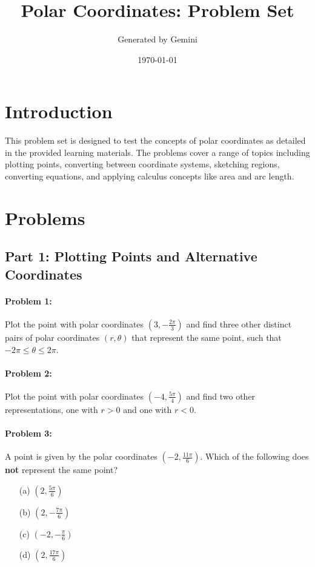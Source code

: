 \documentclass{article}
\title{Polar Coordinates: Problem Set}
\author{Generated by Gemini}
\date{\today}
\begin{document}
\maketitle

\section*{Introduction}
This problem set is designed to test the concepts of polar coordinates as detailed in the provided learning materials. The problems cover a range of topics including plotting points, converting between coordinate systems, sketching regions, converting equations, and applying calculus concepts like area and arc length.

\section{Problems}

\subsection*{Part 1: Plotting Points and Alternative Coordinates}

\paragraph{Problem 1:} Plot the point with polar coordinates $(3, -\frac{2\pi}{3})$ and find three other distinct pairs of polar coordinates $(r, \theta)$ that represent the same point, such that $-2\pi \le \theta \le 2\pi$.

\paragraph{Problem 2:} Plot the point with polar coordinates $(-4, \frac{5\pi}{4})$ and find two other representations, one with $r > 0$ and one with $r < 0$.

\paragraph{Problem 3:} A point is given by the polar coordinates $(-2, \frac{11\pi}{6})$. Which of the following does \textbf{not} represent the same point?
\begin{itemize}
    \item[(a)] $(2, \frac{5\pi}{6})$
    \item[(b)] $(2, -\frac{7\pi}{6})$
    \item[(c)] $(-2, -\frac{\pi}{6})$
    \item[(d)] $(2, \frac{17\pi}{6})$
\end{itemize}
\end{document}
